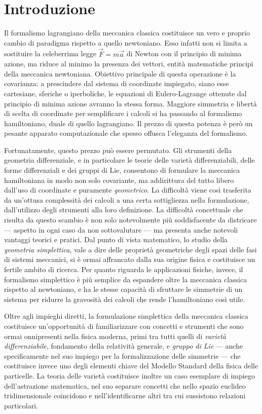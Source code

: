 \chapter*{Introduzione} 
Il formalismo lagrangiano della meccanica classica costituisce un vero e proprio cambio di paradigma rispetto a quello newtoniano. Esso infatti non si limita a sostituire la celeberrima legge $\vec{F}=m\vec{a}$ di Newton con il principio di minima azione, ma riduce al minimo la presenza dei vettori, entità matematiche principi della meccanica newtoniana. Obiettivo principale di questa operazione è la covarianza: a prescindere dal sistema di coordinate impiegato, siano esse cartesiane, sferiche o iperboliche, le equazioni di Eulero-Lagrange ottenute dal principio di minima azione avranno la stessa forma. Maggiore simmetria e libertà di scelta di coordinate per semplificare i calcoli si ha passando al formalismo hamiltoniano, duale di quello lagrangiano. Il prezzo di questa potenza è però un pesante apparato computazionale che spesso offusca l'eleganza del formalismo.

Fortunatamente, questo prezzo può essere permutato. Gli strumenti della geometria differenziale, e in particolare le teorie delle varietà differenziabili, delle forme differenziali e dei gruppi di Lie, consentono di formulare la meccanica hamiltoniana in modo non solo covariante, ma addirittura del tutto libero dall'uso di coordinate e puramente \emph{geometrico}. La difficoltà viene così trasferita da un'ottusa complessità dei calcoli a una certa sottigliezza nella formulazione, dall'utilizzo degli strumenti alla loro definizione. La difficoltà concettuale che risulta da questo scambio è non solo notevolmente più soddisfacente da districare --- aspetto in ogni caso da non sottovalutare --- ma presenta anche notevoli vantaggi teorici e pratici. Dal punto di vista matematico, lo studio della \emph{geometria simplettica}, vale a dire delle proprietà geometriche degli spazi delle fasi di sistemi meccanici, si è ormai affrancato dalla sua origine fisica e costituisce un fertile ambito di ricerca. Per quanto riguarda le applicazioni fisiche, invece, il formalismo simplettico è più semplice da espandere oltre la meccanica classica rispetto al newtoniano, e ha le stesse capacità di sfruttare le simmetrie di un sistema per ridurre la gravosità dei calcoli che rende l'hamiltoniano così utile.

Oltre agli impieghi diretti, la formulazione simplettica della meccanica classica costituisce un'opportunità di familiarizzare con concetti e strumenti che sono ormai onnipresenti nella fisica moderna, primi tra tutti quelli di \emph{varietà differenziabile}, fondamento della relatività generale, e \emph{gruppo di Lie} --- anche specificamente nel suo impiego per la formalizzazione delle simmetrie --- che costituisce invece uno degli elementi chiave del Modello Standard della fisica delle particelle. La teoria delle varietà costituisce inoltre un caso esemplare di impiego dell'astrazione matematica, nel suo separare concetti che nello spazio euclideo tridimensionale coincidono e nell'identificarne altri tra cui sussistono relazioni particolari.

